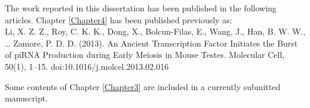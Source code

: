 

\prefaceSection

The work reported in this dissertation has been published in the following articles.
Chapter \ref{Chapter4} has been published previously as:\\
Li, X. Z. Z., Roy, C. K. K., Dong, X., Bolcun-Filas, E., Wang, J., Han, B. W. W., … Zamore, P. D. D. (2013). An Ancient Transcription Factor Initiates the Burst of piRNA Production during Early Meiosis in Mouse Testes. Molecular Cell, 50(1), 1–15. doi:10.1016/j.molcel.2013.02.016

Some contents of Chapter \ref{Chapter3} are included in a currently submitted manuscript. 

\clearpage